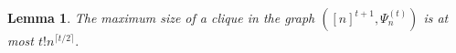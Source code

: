 \documentclass[11pt]{article}
\newcommand{\N}{\ensuremath{\mathbb{N}}}   %
\newcommand{\CLDUI}{\text{\rm CLDUI}}
\newcommand{\LDUI}{\text{\rm LDUI}}
\newcommand{\LDOI}{\text{\rm LDOI}}
\newcommand{\ui}{\underline{i}}
\newcommand{\uj}{\underline{j}}
\theoremstyle{plain}
\newtheorem{lemma}[satz]{Lemma}
\newcommand{\ML}{\textcolor{blue}}
\begin{document}



\begin{lemma}\label{lem:sizecliqueLDOI}
The maximum size of a clique in the graph $([n]^{t+1}, \Psi^{(t)}_n)$ is at most $t! n^{\lceil t/2\rceil}.$
\end{lemma}
\end{document}
